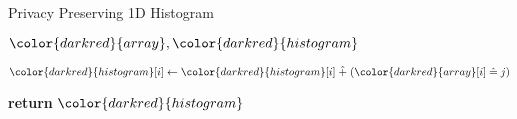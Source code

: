 \begin{algorithm}[H]
\caption{Privacy Preserving 1D Histogram}\label{a:1d-simple-histogram-categorical}
\begin{algorithmic}[1]
\renewcommand{\algorithmicrequire}{\textbf{Private Vars:}}
\Require ${\color{darkred}{array}}, {\color{darkred}{histogram}}$




            \State ${\color{darkred}{histogram}}[i] \gets {\color{darkred}{histogram}}[i] \hplus ({\color{darkred}{array}}[i] \heq j)$

        \EndFor{}
    \EndFor
    \State \textbf{return} {${\color{darkred}{histogram}}$}
\EndProcedure
\end{algorithmic}
\end{algorithm}
